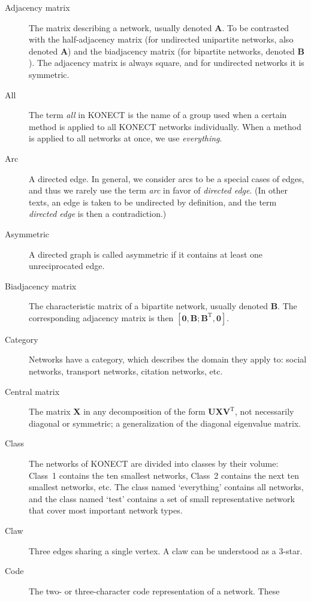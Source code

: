 \documentclass{article}
\begin{document}
\begin{description}
  \item[Adjacency matrix]
    The matrix describing a network, usually denoted $\mathbf A$.  To be
    contrasted with the 
    half-adjacency matrix (for undirected unipartite networks, also
    denoted $\mathbf A$) and the
    biadjacency matrix (for bipartite networks, denoted $\mathbf B$). 
    The adjacency matrix is always square, and for undirected networks
    it is symmetric. 
  \item[All] The term \emph{all} in KONECT is the name of a group used when a certain method
    is applied to all KONECT networks individually.  When a method is
    applied to all networks at once, we use \emph{everything}. 
  \item[Arc] A directed edge.  In general, we consider arcs to be a
    special cases of edges, and thus we rarely use the term \emph{arc}
    in favor of \emph{directed edge}.  (In other texts, an edge is taken
    to be undirected by definition, and the term \emph{directed edge} is
    then a contradiction.)
  \item[Asymmetric] A directed graph is called asymmetric if it contains
    at least one unreciprocated edge. 
  \item[Biadjacency matrix]
    The characteristic matrix of a bipartite network, usually denoted
    $\mathbf B$.  The corresponding adjacency matrix is then $[\mathbf
      0, \mathbf B; \mathbf B^{\mathrm T}, \mathbf 0]$. 
  \item[Category] Networks have a category, which describes the domain
    they apply to:  social networks, transport networks, citation
    networks, etc. 
  \item[Central matrix] The matrix $\mathbf X$ in any decomposition
    of the form $\mathbf U \mathbf X \mathbf V^{\mathrm T}$, not necessarily
    diagonal or symmetric; a generalization of the diagonal eigenvalue
    matrix.
  \item[Class]
    The networks of KONECT are divided into classes by their volume:
    Class~1 contains the ten smallest networks, Class~2 contains the
    next ten smallest networks, etc.  The class named `everything' contains all
    networks, and the class named `test' contains a set of small
    representative network that cover most important network types. 
  \item[Claw]
    Three edges sharing a single vertex.  A claw can be understood as a 3-star. 
  \item[Code]
    The two- or three-character code representation of a network.  These

\end{description}
\end{document}
